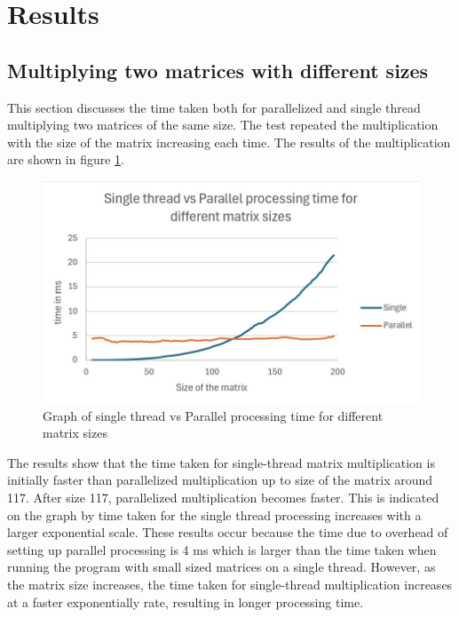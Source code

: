 \section{Results}

\subsection{ Multiplying two matrices with different sizes}
This section discusses the time taken both for parallelized and single thread  multiplying two matrices of the same size.
The test repeated the multiplication with the size of the matrix increasing each time.
The results of the multiplication are shown in figure \ref{fig:Single_thread_vs_Parallel_processing_time}.

\begin{figure}[H]
    \centering
    \includegraphics[width=1\columnwidth]{Figures/Single_thread_vs_Parallel_processing_time_for_different_matrix_sizes}
    \caption{Graph of single thread vs Parallel processing time for different matrix sizes}
    \label{fig:Single_thread_vs_Parallel_processing_time}
\end{figure}

The results show that the time taken for single-thread matrix multiplication is initially faster than parallelized multiplication up to size of the matrix around 117.
After size 117, parallelized multiplication becomes faster. This is indicated on the graph by time taken for the single thread processing increases with a larger exponential scale.
These results occur because the time due to overhead of setting up parallel processing is 4 ms which is larger than the time taken when running the program with small sized matrices on a single thread.
However, as the matrix size increases, the time taken for single-thread multiplication increases at a faster exponentially rate, resulting in longer processing time.

